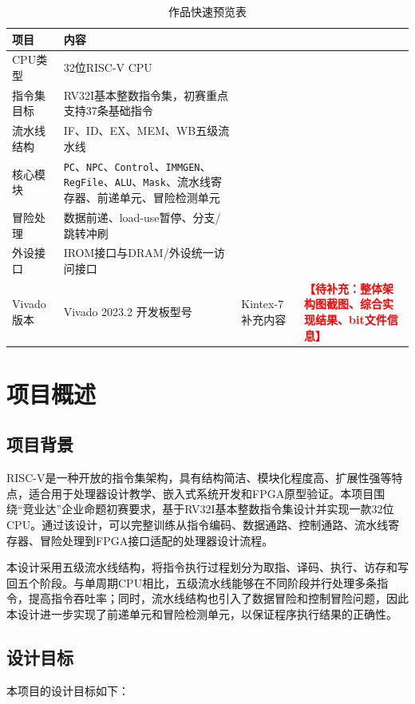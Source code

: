 \documentclass[UTF8,a4paper,12pt]{ctexart}
\newcommand{\todo}[1]{\textcolor{red}{\textbf{【待补充：#1】}}}
\newcommand{\code}[1]{\texttt{#1}}
\begin{document}
\begin{table}[H]
\centering
\caption{作品快速预览表}
\begin{tabularx}{\textwidth}{p{4cm}X}
\toprule
项目 & 内容 \\
\midrule
CPU类型 & 32位RISC-V CPU \\
指令集目标 & RV32I基本整数指令集，初赛重点支持37条基础指令 \\
流水线结构 & IF、ID、EX、MEM、WB五级流水线 \\
核心模块 & \code{PC}、\code{NPC}、\code{Control}、\code{IMMGEN}、\code{RegFile}、\code{ALU}、\code{Mask}、流水线寄存器、前递单元、冒险检测单元 \\
冒险处理 & 数据前递、load-use暂停、分支/跳转冲刷 \\
外设接口 & IROM接口与DRAM/外设统一访问接口 \\
Vivado版本 & Vivado 2023.2
开发板型号 & Kintex-7
补充内容 & \todo{整体架构图截图、综合实现结果、bit文件信息} \\
\bottomrule
\end{tabularx}
\end{table}

\newpage

\section{项目概述}

\subsection{项目背景}

RISC-V是一种开放的指令集架构，具有结构简洁、模块化程度高、扩展性强等特点，适合用于处理器设计教学、嵌入式系统开发和FPGA原型验证。本项目围绕``竞业达''企业命题初赛要求，基于RV32I基本整数指令集设计并实现一款32位CPU。通过该设计，可以完整训练从指令编码、数据通路、控制通路、流水线寄存器、冒险处理到FPGA接口适配的处理器设计流程。

本设计采用五级流水线结构，将指令执行过程划分为取指、译码、执行、访存和写回五个阶段。与单周期CPU相比，五级流水线能够在不同阶段并行处理多条指令，提高指令吞吐率；同时，流水线结构也引入了数据冒险和控制冒险问题，因此本设计进一步实现了前递单元和冒险检测单元，以保证程序执行结果的正确性。

\subsection{设计目标}

本项目的设计目标如下：
\end{document}
